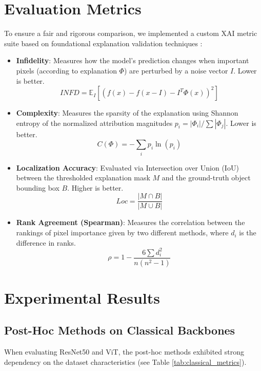 \documentclass[conference]{IEEEtran}
\begin{document}
\section{Evaluation Metrics}
To ensure a fair and rigorous comparison, we implemented a custom XAI metric suite based on foundational explanation validation techniques \cite{yeh2019fidelity}:
\begin{itemize}
    \item \textbf{Infidelity}: Measures how the model's prediction changes when important pixels (according to explanation $\Phi$) are perturbed by a noise vector $I$. Lower is better.
    \begin{equation}
    INFD = \mathbb{E}_{I} \left[ \left( f(x) - f(x - I) - I^T \Phi(x) \right)^2 \right]
    \end{equation}
    \item \textbf{Complexity}: Measures the sparsity of the explanation using Shannon entropy of the normalized attribution magnitudes $p_i = |\Phi_i| / \sum |\Phi_j|$. Lower is better.
    \begin{equation}
    C(\Phi) = - \sum_i p_i \ln(p_i)
    \end{equation}
    \item \textbf{Localization Accuracy}: Evaluated via Intersection over Union (IoU) between the thresholded explanation mask $M$ and the ground-truth object bounding box $B$. Higher is better.
    \begin{equation}
    Loc = \frac{|M \cap B|}{|M \cup B|}
    \end{equation}
    \item \textbf{Rank Agreement (Spearman)}: Measures the correlation between the rankings of pixel importance given by two different methods, where $d_i$ is the difference in ranks.
    \begin{equation}
    \rho = 1 - \frac{6 \sum d_i^2}{n(n^2 - 1)}
    \end{equation}
\end{itemize}

\section{Experimental Results}

\subsection{Post-Hoc Methods on Classical Backbones}
When evaluating ResNet50 and ViT, the post-hoc methods exhibited strong dependency on the dataset characteristics (see Table \ref{tab:classical_metrics}).
\end{document}
